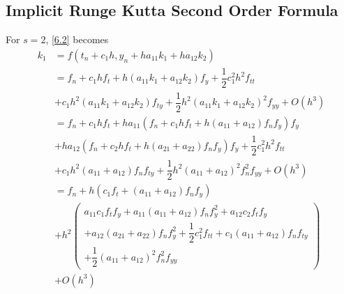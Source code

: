 \documentclass[a4paper,oneside]{book}
\numberwithin{equation}{chapter}
\begin{document}
\subsection{Implicit Runge Kutta Second Order Formula}
For $s=2$, \eqref{6.2} becomes
\begin{align}
{k_1} &= f\left( {{t_n} + {c_1}h,{y_n} + h{a_{11}}{k_1} + h{a_{12}}{k_2}} \right)\\
& = {f_n} + {c_1}h{f_t} + h\left( {{a_{11}}{k_1} + {a_{12}}{k_2}} \right){f_y} + \dfrac{1}{2}c_1^2{h^2}{f_{tt}}\\
& + {c_1}{h^2}\left( {{a_{11}}{k_1} + {a_{12}}{k_2}} \right){f_{ty}} + \dfrac{1}{2}{h^2}{\left( {{a_{11}}{k_1} + {a_{12}}{k_2}} \right)^2}{f_{yy}} + O\left( {{h^3}} \right)\\
& = {f_n} + {c_1}h{f_t} + h{a_{11}}\left( {{f_n} + {c_1}h{f_t} + h\left( {{a_{11}} + {a_{12}}} \right){f_n}{f_y}} \right){f_y}\\
& + h{a_{12}}\left( {{f_n} + {c_2}h{f_t} + h\left( {{a_{21}} + {a_{22}}} \right){f_n}{f_y}} \right){f_y} + \dfrac{1}{2}c_1^2{h^2}{f_{tt}}\\
& + {c_1}{h^2}\left( {{a_{11}} + {a_{12}}} \right){f_n}{f_{ty}} + \dfrac{1}{2}{h^2}{\left( {{a_{11}} + {a_{12}}} \right)^2}f_n^2{f_{yy}} + O\left( {{h^3}} \right)\\
& = {f_n} + h\left( {{c_1}{f_t} + \left( {{a_{11}} + {a_{12}}} \right){f_n}{f_y}} \right)\\
& + {h^2}\left( \begin{array}{l}
{a_{11}}{c_1}{f_t}{f_y} + {a_{11}}\left( {{a_{11}} + {a_{12}}} \right){f_n}f_y^2 + {a_{12}}{c_2}{f_t}{f_y}\\
 + {a_{12}}\left( {{a_{21}} + {a_{22}}} \right){f_n}f_y^2 + \dfrac{1}{2}c_1^2{f_{tt}} + {c_1}\left( {{a_{11}} + {a_{12}}} \right){f_n}{f_{ty}}\\
 + \dfrac{1}{2}{\left( {{a_{11}} + {a_{12}}} \right)^2}f_n^2{f_{yy}}
\end{array} \right)\\
& + O\left( {{h^3}} \right)
\end{align}
\end{document}
